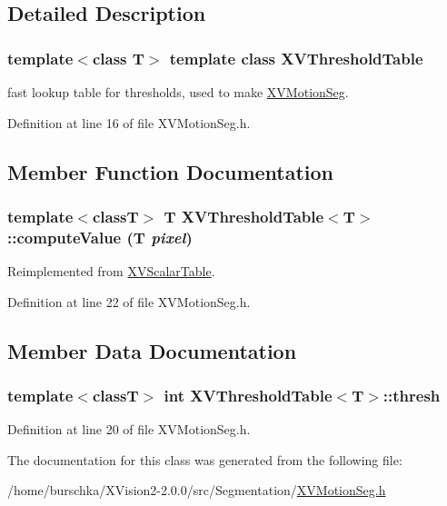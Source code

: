 \subsection{Detailed Description}
\subsubsection*{template$<$class T$>$  template class XVThreshold\-Table}

fast lookup table for thresholds, used to make \hyperlink{class_XVMotionSeg}{XVMotion\-Seg}.





Definition at line 16 of file XVMotion\-Seg.h.

\subsection{Member Function Documentation}
\label{XVThresholdTable_b0}
\hypertarget{class_XVThresholdTable_b0}{
\subsubsection[computeValue]{\setlength{\rightskip}{0pt plus 5cm}template$<$classT$>$ T XVThreshold\-Table$<$T$>$::compute\-Value (T {\em pixel})}}




Reimplemented from \hyperlink{class_XVScalarTable}{XVScalar\-Table}.

Definition at line 22 of file XVMotion\-Seg.h.

\subsection{Member Data Documentation}
\label{XVThresholdTable_n0}
\hypertarget{class_XVThresholdTable_n0}{
\subsubsection[thresh]{\setlength{\rightskip}{0pt plus 5cm}template$<$classT$>$ int XVThreshold\-Table$<$T$>$::thresh}}




Definition at line 20 of file XVMotion\-Seg.h.

The documentation for this class was generated from the following file:\begin{CompactItemize}
\item 
/home/burschka/XVision2-2.0.0/src/Segmentation/\hyperlink{XVMotionSeg.h-source}{XVMotion\-Seg.h}\end{CompactItemize}
